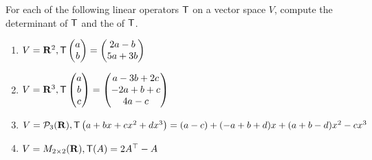 \begin{exercise} \label{exercise 5.1.2}
For each of the following linear operators \(\textsf{T}\) on a vector space \(V\), compute the determinant of \(\textsf{T}\) and the \CPOLY{} of \(\textsf{T}\).
\begin{enumerate}
\item \(V = \mathbf{R}^2, \textsf{T}\begin{pmatrix}a \\ b\end{pmatrix}=\begin{pmatrix}2 a-b \\ 5 a+3 b\end{pmatrix}\)
\item \(V = \mathbf{R}^{3}, \textsf{T}\begin{pmatrix}a \\ b \\ c\end{pmatrix}=\begin{pmatrix}a-3 b+2 c \\ -2 a+b+c \\ 4 a-c\end{pmatrix}\)
\item \(V = \mathcal{P}_{3}(\mathbf{R}), \textsf{T}\left(a+b x+c x^{2}+d x^{3}\right)=(a-c)+(-a+b+d) x+(a+b-d) x^{2}-c x^{3}\)
\item \(V = M_{2 \times 2}(\mathbf{R}), \textsf{T}(A) = 2 A^\top - A\)
\end{enumerate}
\end{exercise}


